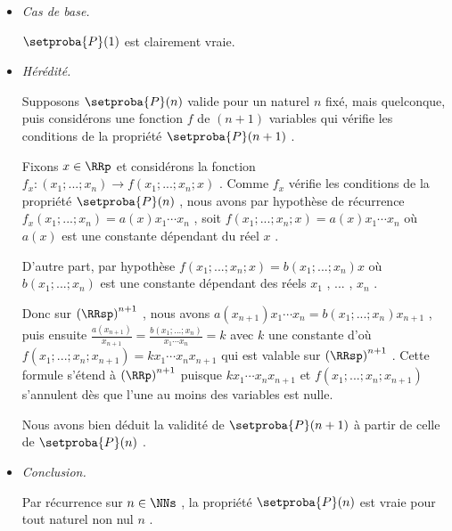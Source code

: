 \begin{itemize}[label=\small\textbullet]
	\item \emph{Cas de base.}
	
	\noindent
	$\setproba{P}(1)$ est clairement vraie.


	\medskip
	\item \emph{Hérédité.}
	
	\noindent
	Supposons $\setproba{P}(n)$ valide pour un naturel $n$ fixé, mais quelconque, puis considérons une fonction $f$ de $(n + 1)$ variables qui vérifie les conditions de la propriété $\setproba{P}(n + 1)$ .
	
	\smallskip
	\noindent
	Fixons $x \in \RRp$ et considérons la fonction $f_x : (x_1 ; ... ; x_n) \rightarrow f(x_1 ; ... ; x_n ; x)$ .
	Comme $f_x$  vérifie les conditions de la propriété $\setproba{P}(n)$ ,
	nous avons par hypothèse de récurrence 
	$f_x(x_1 ; ... ; x_n) = a(x) x_1 \cdots x_n$ , soit $f(x_1 ; ... ; x_n ; x) = a(x) x_1 \cdots x_n$ où $a(x)$ est une constante dépendant du réel $x$ .
	
	\smallskip
	\noindent
	D'autre part, par hypothèse $f(x_1 ; ... ; x_n ; x) = b(x_1 ; ... ; x_n) x$ où $b(x_1 ; ... ; x_n)$ est une constante dépendant des réels $x_1$ , ... , $x_n$ .
	
	\smallskip
	\noindent
	Donc sur $\left( \RRsp \right)^{n+1}$ , nous avons
	$a(x_{n+1}) x_1 \cdots x_n = b(x_1 ; ... ; x_n) x_{n+1}$ ,
	puis ensuite
	$\frac{a(x_{n+1})}{x_{n+1}} = \frac{b(x_1 ; ... ; x_n)}{x_1 \cdots x_n} = k$
	avec $k$ une constante d'où
	$f(x_1 ; ... ; x_n ; x_{n+1}) = k x_1 \cdots x_n x_{n+1}$
	qui est valable sur $\left( \RRsp \right)^{n+1}$ .
	Cette formule s'étend à $\left( \RRp \right)^{n+1}$ puisque
	$k x_1 \cdots x_n x_{n+1}$ et $f(x_1 ; ... ; x_n ; x_{n+1})$ s'annulent dès que l'une au moins des variables est nulle.
	
	\smallskip
	\noindent
	Nous avons bien déduit la validité de $\setproba{P}(n+1)$ à partir de celle de $\setproba{P}(n)$ .


	\medskip
	\item \emph{Conclusion.}
	
	\smallskip
	\noindent
	Par récurrence sur $n \in \NNs$ , la propriété $\setproba{P}(n)$ est vraie pour tout naturel non nul $n$ .
\end{itemize} 

